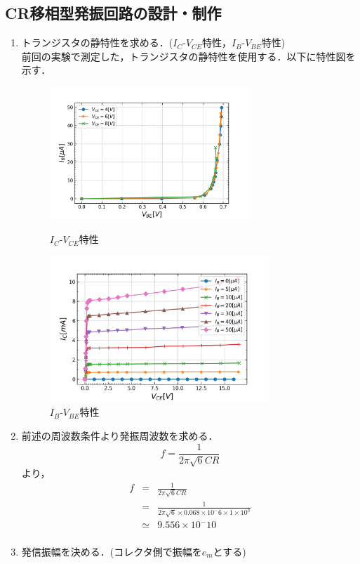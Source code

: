 \documentclass[10pt, a4j, dvipdfmx]{jarticle}
\begin{document}
      \subsection{CR移相型発振回路の設計・制作}
      \begin{enumerate}
        \item トランジスタの静特性を求める．($I_C$-$V_{CE}$特性，$I_B$-$V_{BE}$特性)\\
                前回の実験で測定した，トランジスタの静特性を使用する．以下に特性図を示す．
                \begin{figure}[H]
                    \begin{minipage}{0.5\hsize}
                      \centering
                      \includegraphics[width=75mm]{Ic-Vce.png}
                      \caption{$I_C$-$V_{CE}$特性}
                    \end{minipage}
                    \begin{minipage}{0.5\hsize}
                      \centering
                      \includegraphics[height=55mm]{Ib-Vbe.png}
                      \caption{$I_B$-$V_{BE}$特性}
                    \end{minipage}
                \end{figure}
        \item 前述の周波数条件より発振周波数を求める．\\
                \begin{equation*}
                    f = \frac{1}{2\pi\sqrt{6}CR}
                \end{equation*}
                より，
                \begin{eqnarray*}
                    f & = & \frac{1}{2\pi\sqrt{6}CR}\\
                    & = & \frac{1}{2\pi\sqrt{6} \times 0.068 \times 10^-6 \times 1 \times 10^3}\\
                    & \simeq & 9.556 \times 10^-10\\
                \end{eqnarray*}
        \item 発信振幅を決める．(コレクタ側で振幅を$e_m$とする)\\
                

\end{enumerate}
\end{document}
